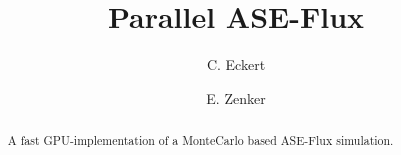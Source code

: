 \documentclass[3p,twocolumn]{elsarticle}
\begin{document}
\title{Parallel ASE-Flux}

\author[hzdr]{C. Eckert}

\author[hzdr]{E. Zenker}

\address[hzdr]{Institute of Radiation Physics, Helmholtz-Zentrum Dresden-Rossendorf e. V., Bautzner Landstraße 400, 01328 Dresden,  Germany}


\begin{abstract}
  A fast GPU-implementation of a MonteCarlo based ASE-Flux simulation. \cite{ASE2010}
\end{abstract}


\maketitle




		

\end{document}
